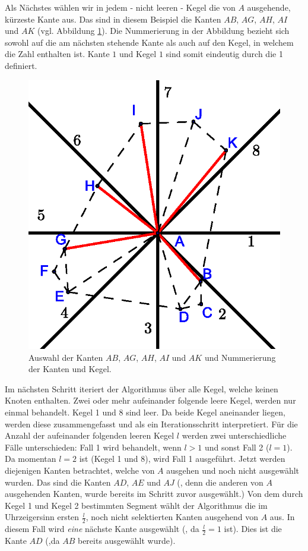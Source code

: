 \documentclass[a4paper,twoside]{IEEEtran}
\begin{document}
Als Nächstes wählen wir in jedem - nicht leeren - Kegel die von $A $ ausgehende, kürzeste Kante aus.
Das sind in diesem Beispiel die Kanten $AB $, $AG $, $AH $, $AI $ und $AK $ (vgl. Abbildung \ref{fig:shortestedge}). 
Die Nummerierung in der Abbildung bezieht sich sowohl auf die am nächsten stehende Kante als auch auf den Kegel, in welchem die Zahl enthalten ist.
Kante $1 $ und Kegel $1 $ sind somit eindeutig durch die 1 definiert.

\begin{figure}[h!]
\centering
\includegraphics[width=0.7\linewidth]{shortest_edge.eps}
\caption{Auswahl der Kanten $AB $, $AG $, $AH $, $AI $ und $AK $ und Nummerierung der Kanten und Kegel.}
\label{fig:shortestedge}
\end{figure}

Im nächsten Schritt iteriert der Algorithmus über alle Kegel, welche keinen Knoten enthalten.
Zwei oder mehr aufeinander folgende leere Kegel, werden nur einmal behandelt.
Kegel 1 und 8 sind leer.
Da beide Kegel aneinander liegen, werden diese zusammengefasst und als ein Iterationsschritt interpretiert.
Für die Anzahl der aufeinander folgenden leeren Kegel $l $ werden zwei unterschiedliche Fälle unterschieden:
Fall 1 wird behandelt, wenn $l>1 $ und sonst Fall 2 ($l=1 $).
Da momentan $l=2 $ ist (Kegel 1 und 8), wird Fall 1 ausgeführt.
Jetzt werden diejenigen Kanten betrachtet, welche von $A $ ausgehen und noch nicht ausgewählt wurden.
Das sind die Kanten $AD $, $AE$ und $AJ $ (, denn die anderen von $A $ ausgehenden Kanten, wurde bereits im Schritt zuvor ausgewählt.)
Von dem durch Kegel 1 und Kegel 2 bestimmten Segment wählt der Algorithmus die im Uhrzeigersinn ersten $\frac{l}{2} $, noch nicht selektierten Kanten ausgehend von $A $ aus.
In diesem Fall wird \emph{eine} nächste Kante ausgewählt (, da $\frac{l}{2} = 1$ ist).
Dies ist die Kante $AD $ (,da $AB $ bereits ausgewählt wurde).
\end{document}
